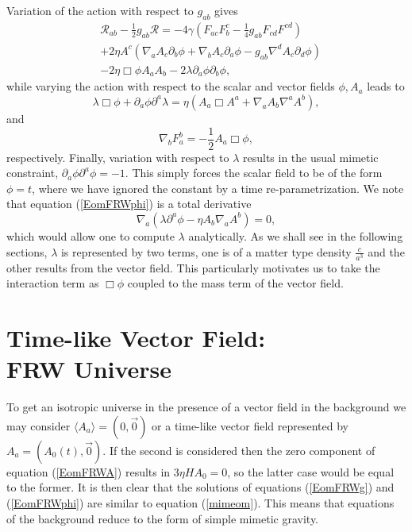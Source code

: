 \documentclass[%
 reprint,
 amsmath,amssymb,
 aps,
]{revtex4-1}
\begin{document}
Variation of the action with respect to $g_{ab}$ gives
\begin{equation}\label{EomFRWg}
\begin{split}
&\mathcal{R}_{ab}-\frac{1}{2}g_{ab}\mathcal{R}=-4\gamma (F_{ac}F^{c}_{b}- \frac{1}{4}g_{ab}F_{cd}F^{cd})\\
&+2\eta A^c(\nabla_a A_c \partial_{b}\phi+\nabla_b A_c \partial_{a}\phi-g_{ab}\nabla^d A_c \partial_d \phi)\\
&-2\eta \Box{\phi}A_{a}A_{b}-2\lambda\partial_a\phi\partial_b\phi,
\end{split}
\end{equation}
while varying the action with respect to the scalar and vector fields $\phi, A_a$ leads to
\begin{equation}\label{EomFRWphi}
\lambda \Box{\phi}+\partial_a\phi\partial^a\lambda=\eta(A_a\Box A^a+\nabla_a A_b\nabla^a A^b),
\end{equation}
and
\begin{equation}\label{EomFRWA}
\nabla_b F^b_a=-\frac{1}{2}A_{a}\Box{\phi},
\end{equation}
respectively. Finally, variation with respect to $\lambda$ results in the usual mimetic constraint, $\partial_a\phi\partial^{a}\phi=-1$. This simply forces the scalar field to be of the form $\phi=t$, where we have ignored the constant by a time re-parametrization. We note that equation (\ref{EomFRWphi}) is a total derivative
\begin{equation}
\nabla_a(\lambda \partial^a\phi-\eta A_b \nabla_a A^b)=0,
\end{equation}
which would allow one to compute $\lambda$ analytically. As we shall see in the following sections, $\lambda$ is represented by two terms, one is of a matter type density $\frac{c}{a^3}$ and the other results from the vector field. This particularly motivates us to take the interaction term as $\Box{\phi}$ coupled to the mass term of the vector field.

\section{Time-like Vector Field:\\FRW Universe }

To get an isotropic universe in the presence of a vector field in the background we may consider $\langle A_a\rangle=(0,\vec{0})$ or a time-like vector field represented by $A_a=(A_0(t),\vec{0})$. If the second is considered then the zero component of equation (\ref{EomFRWA}) results in $3\eta H A_0=0$, so the latter case would be equal to the former. It is then  clear that the solutions of equations (\ref{EomFRWg}) and (\ref{EomFRWphi}) are similar to equation (\ref{mimeom}). This means that equations of the background reduce to the form of simple mimetic gravity.
\end{document}
